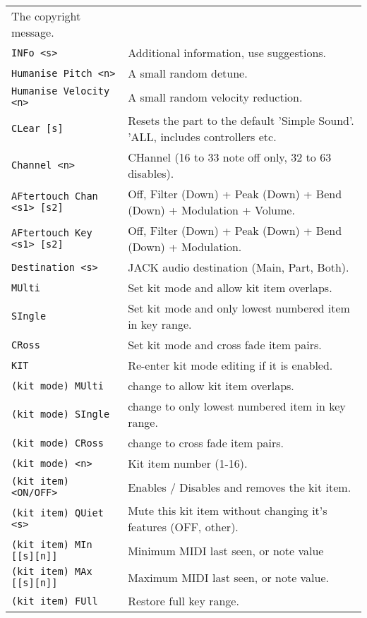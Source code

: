 \begin{center}
\begin{longtable}[l]{ ll}
   The copyright message. \\
\texttt{INFo <s>} &
   Additional information, use suggestions. \\
\texttt{Humanise Pitch <n>} &
   A small random detune. \\
\texttt{Humanise Velocity <n>} &
   A small random velocity reduction. \\
\texttt{CLear [s]} &
  Resets the part to the default 'Simple Sound'. 'ALL, includes controllers
  etc. \\
\texttt{Channel <n>} &
   CHannel (16 to 33 note off only, 32 to 63 disables).   \\
\texttt{AFtertouch Chan <s1> [s2]} &
   Off, Filter (Down) + Peak (Down) + Bend (Down) + Modulation + Volume. \\
\texttt{AFtertouch Key <s1> [s2]} &
   Off, Filter (Down) + Peak (Down) + Bend (Down) + Modulation. \\
\texttt{Destination <s>} &
   JACK audio destination (Main, Part, Both).  \\
\texttt{MUlti} &
   Set kit mode and allow kit item overlaps. \\
\texttt{SIngle} &
   Set kit mode and only lowest numbered item in key range. \\
\texttt{CRoss} &
   Set kit mode and cross fade item pairs. \\
\texttt{KIT} &
   Re-enter kit mode editing if it is enabled. \\
   \texttt{(kit mode) MUlti} &
      change to allow kit item overlaps. \\
   \texttt{(kit mode) SIngle} &
      change to only lowest numbered item in key range. \\
   \texttt{(kit mode) CRoss} &
      change to cross fade item pairs. \\
   \texttt{(kit mode) <n>} &
      Kit item number (1-16). \\
   \texttt{(kit item) <ON/OFF>} &
      Enables / Disables and removes the kit item. \\
   \texttt{(kit item) QUiet <s>} &
      Mute this kit item without changing it's features (OFF, {other}). \\
   \texttt{(kit item) MIn [[s][n]]} &
      Minimum MIDI last seen, or note value   \\
   \texttt{(kit item) MAx [[s][n]]} &
      Maximum MIDI last seen, or note value.   \\
   \texttt{(kit item) FUll} &
      Restore full key range.   \\

\end{longtable}
\end{center}
